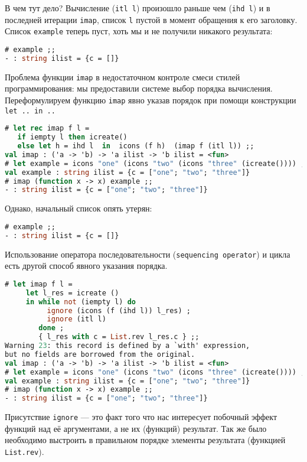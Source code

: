 В чем тут дело? Вычисление (\texttt{itl l}) произошло раньше чем (\texttt{ihd
l}) и в последней итерации \texttt{imap}, список \texttt{l} пустой в момент
обращения к его заголовку. Список \texttt{example} теперь пуст, хоть мы и не
получили никакого результата:

\begin{lstlisting}[language=OCaml]
# example ;;
- : string ilist = {c = []}
\end{lstlisting}

Проблема функции \texttt{imap} в недостаточном контроле смеси стилей
программирования: мы предоставили системе выбор порядка вычисления.
Переформулируем функцию \texttt{imap} явно указав порядок при помощи конструкции
\texttt{let .. in ..}

\begin{lstlisting}[language=OCaml]
# let rec imap f l =
   if iempty l then icreate()
   else let h = ihd l  in  icons (f h)  (imap f (itl l)) ;;
val imap : ('a -> 'b) -> 'a ilist -> 'b ilist = <fun>
# let example = icons "one" (icons "two" (icons "three" (icreate()))) ;;
val example : string ilist = {c = ["one"; "two"; "three"]}
# imap (function x -> x) example ;;
- : string ilist = {c = ["one"; "two"; "three"]}
\end{lstlisting}

Однако, начальный список опять утерян:

\begin{lstlisting}[language=OCaml]
# example ;;
- : string ilist = {c = []}
\end{lstlisting}

Использование оператора последовательности (\texttt{sequencing operator}) и
цикла есть другой способ явного указания порядка.

\begin{lstlisting}[language=OCaml]
# let imap f l =
     let l_res = icreate ()
     in while not (iempty l) do
          ignore (icons (f (ihd l)) l_res) ;
          ignore (itl l)
        done ;
        { l_res with c = List.rev l_res.c } ;;
Warning 23: this record is defined by a `with' expression,
but no fields are borrowed from the original.
val imap : ('a -> 'b) -> 'a ilist -> 'b ilist = <fun>
# let example = icons "one" (icons "two" (icons "three" (icreate()))) ;;
val example : string ilist = {c = ["one"; "two"; "three"]}
# imap (function x -> x) example ;;
- : string ilist = {c = ["one"; "two"; "three"]}
\end{lstlisting}

Присутствие \texttt{ignore} --- это факт того что нас интересует побочный эффект
функций над её аргументами, а не их (функций) результат. Так же было необходимо
выстроить в правильном порядке элементы результата (функцией \texttt{List.rev}).


